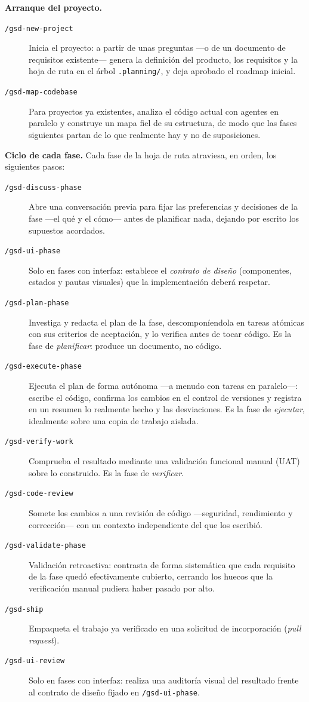 \medskip\noindent\textbf{Arranque del proyecto.}
\begin{description}
  \item[\texttt{/gsd-new-project}] Inicia el proyecto: a partir de unas preguntas ---o de un
    documento de requisitos existente--- genera la definici\'on del producto, los requisitos y la
    hoja de ruta en el \'arbol \texttt{.planning/}, y deja aprobado el roadmap inicial.
  \item[\texttt{/gsd-map-codebase}] Para proyectos ya existentes, analiza el c\'odigo actual con
    agentes en paralelo y construye un mapa fiel de su estructura, de modo que las fases siguientes
    partan de lo que realmente hay y no de suposiciones.
\end{description}

\medskip\noindent\textbf{Ciclo de cada fase.} Cada fase de la hoja de ruta atraviesa, en orden,
los siguientes pasos:
\begin{description}
  \item[\texttt{/gsd-discuss-phase}] Abre una conversaci\'on previa para fijar las preferencias y
    decisiones de la fase ---el qu\'e y el c\'omo--- antes de planificar nada, dejando por escrito
    los supuestos acordados.
  \item[\texttt{/gsd-ui-phase}] Solo en fases con interfaz: establece el \emph{contrato de
    dise\~no} (componentes, estados y pautas visuales) que la implementaci\'on deber\'a respetar.
  \item[\texttt{/gsd-plan-phase}] Investiga y redacta el plan de la fase, descompon\'iendola en
    tareas at\'omicas con sus criterios de aceptaci\'on, y lo verifica antes de tocar c\'odigo. Es
    la fase de \emph{planificar}: produce un documento, no c\'odigo.
  \item[\texttt{/gsd-execute-phase}] Ejecuta el plan de forma aut\'onoma ---a menudo con tareas en
    paralelo---: escribe el c\'odigo, confirma los cambios en el control de versiones y registra en
    un resumen lo realmente hecho y las desviaciones. Es la fase de \emph{ejecutar}, idealmente
    sobre una copia de trabajo aislada.
  \item[\texttt{/gsd-verify-work}] Comprueba el resultado mediante una validaci\'on funcional
    manual (UAT) sobre lo construido. Es la fase de \emph{verificar}.
  \item[\texttt{/gsd-code-review}] Somete los cambios a una revisi\'on de c\'odigo ---seguridad,
    rendimiento y correcci\'on--- con un contexto independiente del que los escribi\'o.
  \item[\texttt{/gsd-validate-phase}] Validaci\'on retroactiva: contrasta de forma sistem\'atica
    que cada requisito de la fase qued\'o efectivamente cubierto, cerrando los huecos que la
    verificaci\'on manual pudiera haber pasado por alto.
  \item[\texttt{/gsd-ship}] Empaqueta el trabajo ya verificado en una solicitud de incorporaci\'on
    (\emph{pull request}).
  \item[\texttt{/gsd-ui-review}] Solo en fases con interfaz: realiza una auditor\'ia visual del
    resultado frente al contrato de dise\~no fijado en \texttt{/gsd-ui-phase}.
\end{description}

